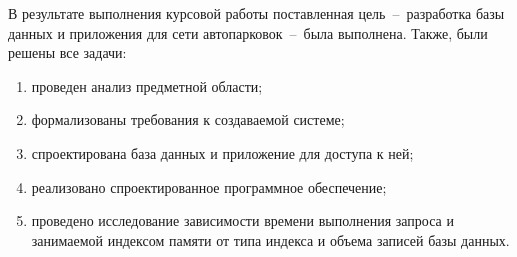 В результате выполнения курсовой работы поставленная цель~--~разработка базы данных и приложения для сети автопарковок~--~была выполнена. Также, были решены все задачи:
\begin{enumerate}
	\item проведен анализ предметной области;
	\item формализованы требования к создаваемой системе;
	\item спроектирована база данных и приложение для доступа к ней;
	\item реализовано спроектированное программное обеспечение;
	\item проведено исследование зависимости времени выполнения запроса и занимаемой индексом памяти от типа индекса и объема записей базы данных.
\end{enumerate}

